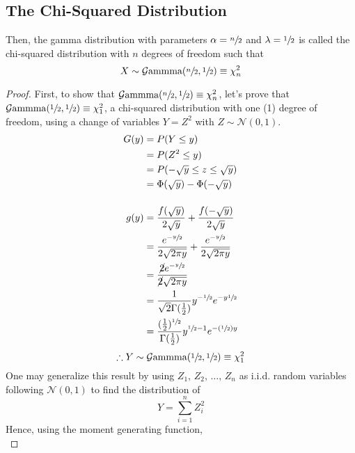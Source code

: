 \documentclass[12pt]{article}
\newcommand{\G}{\mathcal{G}}
\newcommand{\N}{\mathcal{N}}
\begin{document}
\subsection{The Chi-Squared Distribution}\label{subsec:specialcases:chi2}
Then, the gamma distribution with parameters $\alpha=\sfrac{n}{2}$ and $\lambda=\sfrac{1}{2}$ is called the
chi-squared distribution with $n$ degrees of freedom such that
\begin{equation}
	X\sim\G\text{ammma}(\sfrac{n}{2}, \sfrac{1}{2})\equiv\chi^2_n
\end{equation}
\begin{proof}
	First, to show that $\G\text{ammma}(\sfrac{n}{2},\sfrac{1}{2})\equiv\chi^2_n$, let's prove that
	$\G\text{ammma}(\sfrac{1}{2},\sfrac{1}{2})\equiv\chi^2_1$, a chi-squared distribution with one (1) degree of
	freedom, using a change of variables $Y=Z^2$ with $Z\sim\N(0, 1)$.
	\begin{equation}\label{eq:relation:chisquared:1}
		\begin{split}
			G(y)	&=	P(Y\leq y)\\
					&=	P(Z^2\leq y)\\
					&=	P(-\sqrt{y}\leq z \leq \sqrt{y})\\
					&=	\Phi(\sqrt{y})-\Phi(-\sqrt{y})\\[12pt]
			g(y)	&=	\frac{f(\sqrt{y})}{2\sqrt{y}}+\frac{f(-\sqrt{y})}{2\sqrt{y}}\\
					&=	\frac{e^{-\sfrac{y}{2}}}{2\sqrt{2\pi y}} + \frac{e^{-\sfrac{y}{2}}}{2\sqrt{2\pi y}}\\
					&=	\frac{\cancel{2}e^{-\sfrac{y}{2}}}{\cancel{2}\sqrt{2\pi y}}\\
					&=	\frac{1}{\sqrt{2}\Gamma(\frac{1}{2})}y^{-\sfrac{1}{2}}e^{-y\sfrac{1}{2}}\\
					&=	\frac{(\frac{1}{2})^{\sfrac{1}{2}}}{\Gamma(\frac{1}{2})}y^{\sfrac{1}{2}-1}e^{-(\sfrac{1}{2})y}
			\end{split}
	\end{equation}
	\begin{equation}
		\therefore Y\sim\G\text{ammma}(\sfrac{1}{2}, \sfrac{1}{2})\equiv\chi^2_1
	\end{equation}
	One may generalize this result by using $Z_1,\,Z_2,\,\ldots,\,Z_n$ as i.i.d. random variables following $\N(0, 1)$
	to find the distribution of
	\begin{equation}
		Y = \sum^n_{i=1}Z^2_i
	\end{equation}
	Hence, using the moment generating function,
	\begin{equation}\label{eq:relation:chisquared:n}

\end{equation}
\end{proof}
\end{document}
